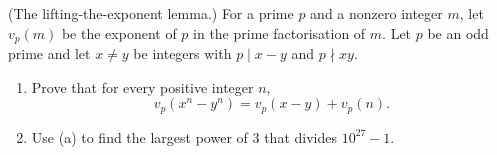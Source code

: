 (The lifting-the-exponent lemma.) For a prime $p$ and a nonzero integer $m$, let $v_p(m)$ be the exponent of $p$ in the prime factorisation of $m$. Let $p$ be an odd prime and let $x\ne y$ be integers with $p\mid x-y$ and $p\nmid xy$.
\begin{enumerate}
\item[(a)] Prove that for every positive integer $n$,
\[v_p\left(x^n-y^n\right)=v_p(x-y)+v_p(n).\]
\item[(b)] Use (a) to find the largest power of $3$ that divides $10^{27}-1$.
\end{enumerate}
